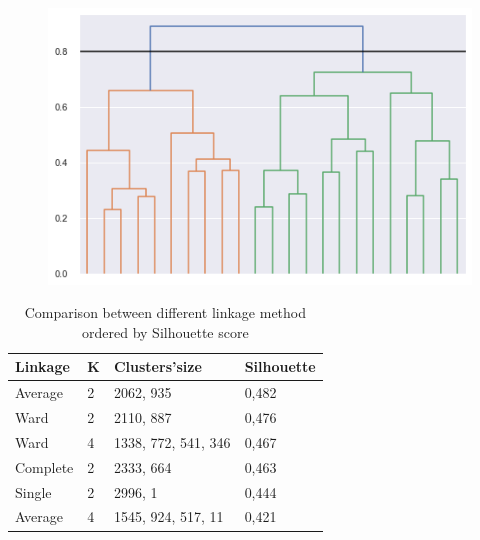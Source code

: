 \begin{figure}[h!]
\begin{minipage}{.50\textwidth}
	\end{minipage}%
	\begin{minipage}{.50\textwidth}
		\centering
		\includegraphics[width=\textwidth]{plots/hierarchical/hierarchical_dendogram_average.png}
	\end{minipage}
	\label{figure:hierarchical_dendrograms}
\end{figure}

\begin{table}[h]
\centering
\begin{tabular}{|l|l|l|l|}
\hline
\textbf{Linkage} & \textbf{K} & \textbf{Clusters'size} & \textbf{Silhouette} \\ \hline\hline
Average          & 2          & 2062, 935              & 0,482               \\ \hline
Ward             & 2          & 2110, 887              & 0,476               \\ \hline
Ward             & 4          & 1338, 772, 541, 346    & 0,467               \\ \hline
Complete         & 2          & 2333, 664              & 0,463               \\ \hline
Single           & 2          & 2996, 1                & 0,444               \\ \hline
Average          & 4          & 1545,  924,  517, 11   & 0,421               \\ \hline
\end{tabular}
\caption{Comparison between different linkage method ordered by Silhouette score}
\label{tab:hierarchical-table}
\end{table}

